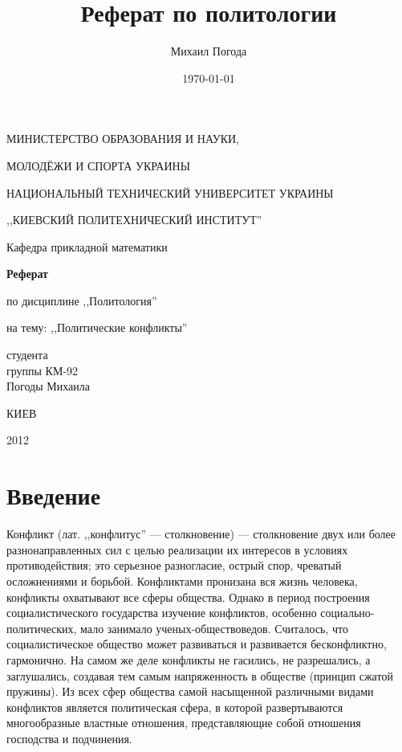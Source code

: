 \documentclass[a4paper,12pt,notitlepage,pdftex,headsepline]{scrartcl}
\author{Михаил Погода}
\title{Реферат по политологии}
\date{\today}
\begin{document}
  \thispagestyle{empty}
  \begin{center}
    \large
    \MakeUppercase{Министерство образования и науки,}

    \MakeUppercase{молодёжи и спорта Украины}

    \MakeUppercase{Национальный технический университет Украины}

    \MakeUppercase{,,Киевский политехнический институт''}

    \addvspace{6pt}

    \normalsize
    Кафедра прикладной математики

    \vfill

    \textbf{Реферат}

    по дисциплине ,,Политология''

    на тему: ,,Политические конфликты''
  \end{center}

  \vfill

  \begin{flushright}
    студента\\
    группы КМ-92\\
    Погоды Михаила
  \end{flushright}

  \vfill

  \begin{center}
    КИЕВ

    2012
  \end{center}
  \clearpage
  \tableofcontents
  \clearpage
\section{Введение}
  Конфликт (лат. ,,конфлитус'' --- столкновение) --- столкновение двух или
  более разнонаправленных сил с целью реализации их интересов в условиях
  противодействия; это серьезное разногласие, острый спор, чреватый
  осложнениями и борьбой.
  Конфликтами пронизана вся жизнь человека, конфликты охватывают все сферы
  общества.
  Однако в период построения социалистического государства изучение
  конфликтов, особенно социально-политических, мало занимало
  ученых-обществоведов.
  Считалось, что социалистическое общество может развиваться и развивается
  бесконфликтно, гармонично.
  На самом же деле конфликты не гасились, не разрешались, а заглушались,
  создавая тем самым напряженность в обществе (принцип сжатой пружины).
  Из всех сфер общества самой насыщенной различными видами конфликтов является
  политическая сфера, в которой развертываются многообразные властные
  отношения, представляющие собой отношения господства и подчинения.
\end{document}
